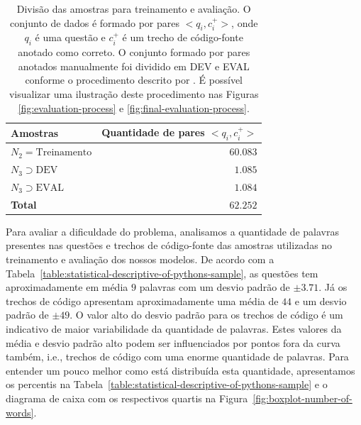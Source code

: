 \begin{table}[h]
\centering
\caption[Divisão das amostras para treinamento e avaliação.]{Divisão das amostras para treinamento e avaliação. O conjunto de dados é formado por pares $<q_{i}, c_{i}^{+}>$, onde $q_{i}$ é uma questão e $c_{i}^{+}$ é um trecho de código-fonte anotado como correto. O conjunto formado por pares anotados manualmente foi dividido em DEV e EVAL conforme o procedimento descrito por . É possível visualizar uma ilustração deste procedimento nas Figuras \ref{fig:evaluation-process} e \ref{fig:final-evaluation-process}.  }
\begin{tabular}{ p{5cm} r  }
 \hline
 \textbf{Amostras} & \textbf{Quantidade de pares $<q_{i}, c_{i}^{+}>$}\\
 \hline
 $N_{2} = \text{Treinamento}$ & $60.083$\\
 
 $N_{3} \supset \text{DEV}$ & $1.085$ \\
 
 $N_{3} \supset \text{EVAL}$ & $1.084$\\
 \hline
 \textbf{Total} & $\bm{62.252}$\\
 \hline
\end{tabular}
\label{table:divisao-amostras}
\end{table}


Para avaliar a dificuldade do problema, analisamos a quantidade de palavras presentes nas questões e trechos de código-fonte das amostras utilizadas no treinamento e avaliação dos nossos modelos. De acordo com a Tabela~\ref{table:statistical-descriptive-of-pythons-sample}, as questões tem aproximadamente em média $9$ palavras com um desvio padrão de $\pm 3.71$. Já os trechos de código apresentam aproximadamente uma média de $44$ e um desvio padrão de $\pm 49$. O valor alto do desvio padrão para os trechos de código é um indicativo de maior variabilidade da quantidade de palavras. Estes valores da média e desvio padrão alto podem ser influenciados por pontos fora da curva também, i.e., trechos de código com uma enorme quantidade de palavras. Para entender um pouco melhor como está distribuída esta quantidade, apresentamos os percentis na Tabela~\ref{table:statistical-descriptive-of-pythons-sample} e o diagrama de caixa com os respectivos quartis na Figura~\ref{fig:boxplot-number-of-words}.

